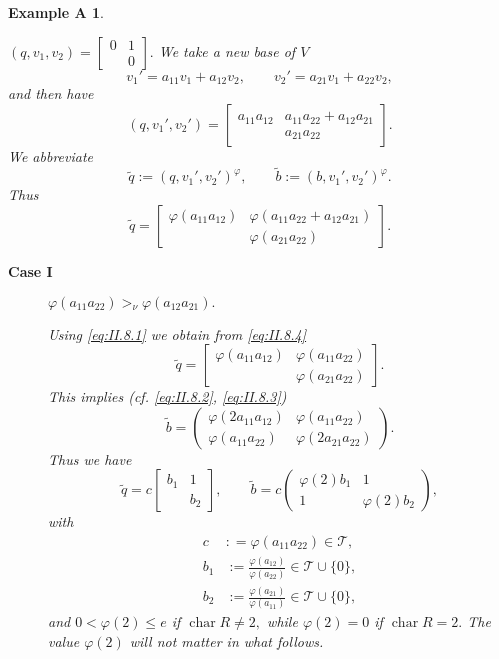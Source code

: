\documentclass [12pt,a4paper,reqno]{amsart}
\newtheorem*{exampleA*}{Example A}
\begin{document}
\begin{exampleA*} $ $

$(q,v_1,v_2)=\begin{bmatrix} 0 & 1\\  & 0\end{bmatrix}.$
We take a new base of $V$
$$v_1'=a_{11}v_1+a_{12}v_2,\qquad v_2'=a_{21}v_1+a_{22}v_2,$$
and then have
$$(q,v_1',v_2')=\begin{bmatrix} a_{11}a_{12} & a_{11}a_{22}+a_{12}a_{21}\\
 & a_{21}a_{22}\end{bmatrix}.$$
We abbreviate
$${\tilde q}:=(q,v_1',v_2')^{\varphi},\qquad {\tilde b}:=(b,v_1',v_2')^{\varphi}.$$
Thus
\begin{equation}\label{eq:II.8.4}
{\tilde q}=\begin{bmatrix} {\varphi}(a_{11}a_{12})& {\varphi}(a_{11}a_{22}+a_{12}a_{21})\\  & {\varphi}(a_{21}a_{22})\end{bmatrix}.
\end{equation}

\begin{description}
  \item[\textbf{Case I}]

 ${\varphi}(a_{11}a_{22})>_\nu {\varphi}(a_{12}a_{21}).$

Using \eqref{eq:II.8.1} we obtain from \eqref{eq:II.8.4}
$${\tilde q}=\begin{bmatrix} {\varphi}(a_{11}a_{12}) & {\varphi}(a_{11}a_{22})\\  & {\varphi}(a_{21}a_{22})\end{bmatrix}.$$
This implies (cf. \eqref{eq:II.8.2}, \eqref{eq:II.8.3})
$${\tilde b}=\begin{pmatrix} {\varphi}(2a_{11}a_{12}) & {\varphi}(a_{11}a_{22})\\
{\varphi}(a_{11}a_{22})& {\varphi}(2a_{21}a_{22})\end{pmatrix}.$$
Thus we have
$${\tilde q}=c\begin{bmatrix} b_1 &1\\  & b_2\end{bmatrix},\qquad {\tilde b}=c\begin{pmatrix}{\varphi}(2)b_1 & 1\\ 1 & {\varphi}(2)b_2\end{pmatrix},$$
with
\begin{align*}c&: = {\varphi}(a_{11}a_{22})\in{\mathcal T},\\
 b_1&:=\frac{{\varphi}(a_{12})}{{\varphi}(a_{22})}\in{\mathcal T}\cup\{0\},\\
 b_2&:=\frac{{\varphi}(a_{21})}{{\varphi}(a_{11})}\in{\mathcal T}\cup\{0\},\end{align*}
 and $0<{\varphi}(2)\le e$ if ${\operatorname{char}} R\ne 2,$ while ${\varphi}(2)=0$ if ${\operatorname{char}} R=2.$ The value ${\varphi}(2)$ will not matter in what follows.


\end{description}
\end{exampleA*}
\end{document}
